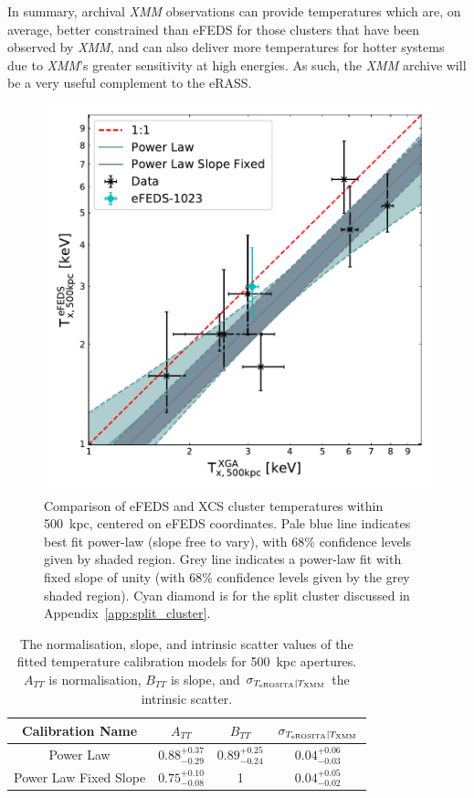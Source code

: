 \documentclass[fleqn,usenatbib]{mnras}
\begin{document}
In summary, archival {\em XMM} observations can provide temperatures which are, on average, better constrained than eFEDS for those clusters that have been observed by {\em XMM}, and can also deliver more temperatures for hotter systems due to {\em XMM}'s greater sensitivity at high energies.  As such, the {\em XMM} archive will be a very useful complement to the eRASS.

\begin{figure}
    \centering
    \includegraphics[width=0.95\columnwidth]{images/efeds_xcs_t500cal.pdf}
    \caption[]{Comparison of eFEDS and XCS cluster temperatures within 500~kpc, centered on eFEDS coordinates. Pale blue line indicates best fit power-law (slope free to vary), with 68\% confidence levels given by shaded region. Grey line indicates a power-law fit with fixed slope of unity (with 68\% confidence levels given by the grey shaded region). Cyan diamond is for the split cluster discussed in Appendix~\ref{app:split_cluster}.}
    \label{fig:t500kpccomp}
\end{figure}

\begin{table}
\begin{center}
\caption[]{{\small The normalisation, slope, and intrinsic scatter values of the fitted temperature calibration models for 500~kpc apertures. $A_{TT}$ is normalisation, $B_{TT}$ is slope, and $\sigma_{T_{\rm{eROSITA}}|T_{\rm{XMM}}}$ the intrinsic scatter.}\label{tab:tempcal}}
\vspace{1mm}
\begin{tabular}{cccc}
\hline
\hline
Calibration Name & $A_{TT}$ & $B_{TT}$ & $\sigma_{T_{\rm{eROSITA}}|T_{\rm{XMM}}}$\\
\hline
\hline
Power Law & $0.88^{+0.37}_{-0.29}$ & $0.89^{+0.25}_{-0.24}$ & $0.04^{+0.06}_{-0.03}$ \\
\hline
Power Law Fixed Slope & $0.75^{+0.10}_{-0.08}$ & 1 & $0.04^{+0.05}_{-0.02}$ \\
\hline
\end{tabular}
\end{center}
\end{table}
\end{document}
